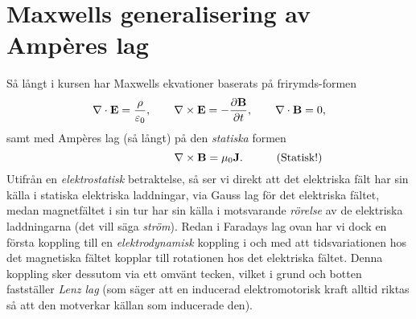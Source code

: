 \section{Maxwells generalisering av Amp\`eres lag}
S{\aa} l{\aa}ngt i kursen
har Maxwells ekvationer baserats p{\aa} frirymds-formen
$$
  \nabla\cdot{\bf E}={{\rho}\over{\varepsilon_0}},\qquad
  \nabla\times{\bf E}=-{{\partial{\bf B}}\over{\partial t}},\qquad
  \nabla\cdot{\bf B}=0,
$$
samt med Amp\`eres lag (s{\aa} l{\aa}ngt) p{\aa} den {\it statiska} formen
$$
  \hskip70pt\nabla\times{\bf B}=\mu_0{\bf J}.\hskip30pt(\hbox{Statisk!})
$$
Utifr{\aa}n en {\it elektrostatisk} betraktelse, s{\aa} ser vi direkt att det
elektriska f{\"a}lt har sin k{\"a}lla i statiska elektriska laddningar, via
Gauss lag f{\"o}r det elektriska f{\"a}ltet, medan magnetf{\"a}ltet i sin tur
har sin k{\"a}lla i motsvarande {\it r{\"o}relse} av de elektriska laddningarna
(det vill s{\"a}ga {\it str{\"o}m}). Redan i Faradays lag ovan har vi dock en
f{\"o}rsta koppling till en {\it elektrodynamisk} koppling i och med att
tidsvariationen hos det magnetiska f{\"a}ltet kopplar till rotationen hos det
elektriska f{\"a}ltet. Denna koppling sker dessutom via ett omv{\"a}nt tecken,
vilket i grund och botten fastst{\"a}ller {\it Lenz lag} (som s{\"a}ger att en
inducerad elektromotorisk kraft alltid riktas s{\aa} att den motverkar
k{\"a}llan som inducerade den).

